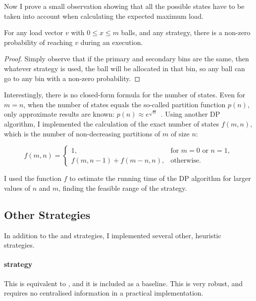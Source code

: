 Now I prove a small observation showing that all the possible states have to be taken into account when calculating the expected maximum load.


\begin{observation} \label{observation: everystatereachable}
For any load vector $v$ with $0\leq x\leq m$ balls, and any strategy, there is a non-zero probability of reaching $v$ during an execution.
\end{observation}

\begin{proof}
    Simply observe that if the primary and secondary bins are the same, then whatever strategy is used, the ball will be allocated in that bin, so any ball can go to any bin with a non-zero probability.
\end{proof}


Interestingly, there is no closed-form formula for the number of states. Even for $m=n$, when the number of states equals the so-called partition function $p(n)$, only approximate results are known: $p(n) \approx e^{\sqrt{n}}$~\cite{hardy1918partitionfunction}. Using another DP algorithm, I implemented the calculation of the exact number of states $f(m, n)$, which is the number of non-decreasing partitions of $m$ of size $n$:

\begin{equation} \label{eq: numberofpartitions}
    f(m, n) = \begin{cases}
        1, & \text{for } m=0\text{ or } n=1,\\
        f(m,n-1)+f(m-n,n), & \text{otherwise}.
    \end{cases}
\end{equation}


I used the function $f$ to estimate the running time of the DP algorithm for larger values of $n$ and $m$, finding the feasible range of the \DP strategy.


\subsection{Other Strategies} \label{two-thinning-otherstrategies}

In addition to the \DQN and \DP strategies, I implemented several other, heuristic strategies.


\paragraph{\AlwaysAccept strategy}
This is equivalent to \OneChoice, and it is included as a baseline. This is very robust, and requires no centralised information in a practical implementation.


